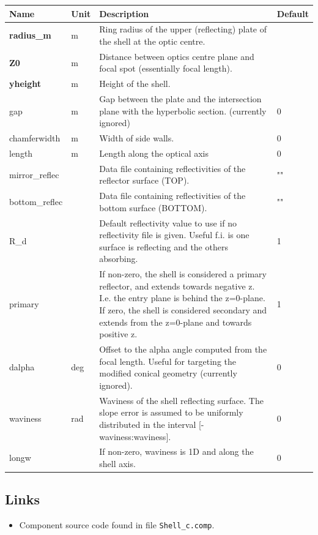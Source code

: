 \begin{longtable}{p{}p{}p{}p{}}
\toprule
\textbf{Name} & \textbf{Unit} & \textbf{Description} & \textbf{Default} \\
\midrule
\endhead
\textbf{radius\_m} & m & Ring radius of the upper (reflecting) plate of the shell at the optic centre. &  \\
\textbf{Z0} & m & Distance between optics centre plane and focal spot (essentially focal length). &  \\
\textbf{yheight} & m & Height of the shell. &  \\
gap & m & Gap between the plate and the intersection plane with the hyperbolic section. (currently ignored) & 0 \\
chamferwidth & m & Width of side walls. & 0 \\
length & m & Length along the optical axis & 0 \\
mirror\_reflec &   & Data file containing reflectivities of the reflector surface (TOP). & "" \\
bottom\_reflec &   & Data file containing reflectivities of the bottom surface (BOTTOM). & "" \\
R\_d &   & Default reflectivity value to use if no reflectivity file is given. Useful f.i. is one surface is reflecting and the others absorbing. & 1 \\
primary &   & If non-zero, the shell is considered a primary reflector, and extends towards negative z. I.e. the entry plane is behind the z=0-plane. If zero, the shell is considered secondary and extends from the z=0-plane and towards positive z. & 1 \\
dalpha & deg & Offset to the alpha angle computed from the focal length. Useful for targeting the modified conical geometry (currently ignored). & 0 \\
waviness & rad & Waviness of the shell reflecting surface. The slope error is assumed to be uniformly distributed in the interval [-waviness:waviness]. & 0 \\
longw &   & If non-zero, waviness is 1D and along the shell axis. & 0 \\
\bottomrule
\end{longtable}

\subsection*{Links}
\begin{itemize}
  \item Component source code found in file \texttt{Shell\_c.comp}.
\end{itemize}
